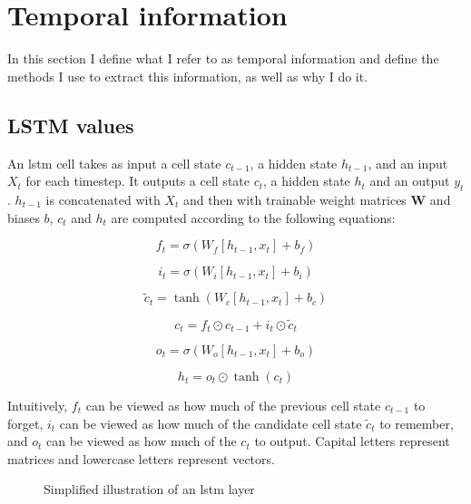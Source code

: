 \documentclass[UKenglish]{uiomasterthesis}
\begin{document}
\section{Temporal information}
\label{sec:temp_meth}
In this section I define what I refer to as temporal information and define the methods I use to extract this information, as well as why I do it.

\subsection{LSTM values}
An \ac{lstm} cell takes as input a cell state $c_{t-1}$, a hidden state $h_{t-1}$, and an input $X_t$ for each timestep. It outputs a cell state $c_{t}$, a hidden state $h_{t}$ and an output $y_t$. $h_{t-1}$ is concatenated with $X_t$ and then with trainable weight matrices $\textbf{W}$ and biases $b$, $c_t$ and $h_t$ are computed according to the following equations:

\[
f_t = \sigma(W_f [h_{t-1}, x_t] + b_f)
\]

\[
i_t = \sigma(W_i [h_{t-1}, x_t] + b_i)
\]

\[
\tilde{c}_t = \tanh(W_c [h_{t-1}, x_t] + b_c)
\]

\[
c_t = f_t \odot c_{t-1} + i_t \odot \tilde{c}_t
\]

\[
o_t = \sigma(W_o [h_{t-1}, x_t] + b_o)
\]

\[
h_t = o_t \odot \tanh(c_t)
\]

Intuitively, $f_t$ can be viewed as how much of the previous cell state $c_{t-1}$ to forget, $i_t$ can be viewed as how much of the candidate cell state $\tilde{c}_t$ to remember, and $o_t$ can be viewed as how much of the $c_{t}$ to output. Capital letters represent matrices and lowercase letters represent vectors.

\begin{center}
\begin{figure}
\caption{Simplified illustration of an \ac{lstm} layer}
\label{fig:lstm}
\end{figure}
\end{center}
\end{document}

